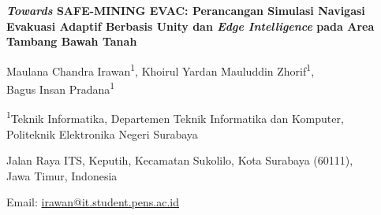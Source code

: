 \documentclass[10pt,a4paper]{article}
\begin{document}
\begin{center}
{\fontsize{16}{18}\selectfont\bfseries \emph{Towards} SAFE-MINING EVAC: Perancangan Simulasi Navigasi Evakuasi Adaptif Berbasis Unity dan \emph{Edge Intelligence} pada Area Tambang Bawah Tanah\par}
\vspace{8pt}
{\fontsize{11}{13}\selectfont
Maulana Chandra Irawan\textsuperscript{1}, Khoirul Yardan Mauluddin Zhorif\textsuperscript{1},\\
Bagus Insan Pradana\textsuperscript{1}\par
\vspace{4pt}
\textsuperscript{1}Teknik Informatika, Departemen Teknik Informatika dan Komputer,\\
Politeknik Elektronika Negeri Surabaya\par
Jalan Raya ITS, Keputih, Kecamatan Sukolilo, Kota Surabaya (60111),\\
Jawa Timur, Indonesia\par
Email: \href{mailto:irawan@it.student.pens.ac.id}{irawan@it.student.pens.ac.id}\par}
\end{center}
\vspace{4pt}
\end{document}
